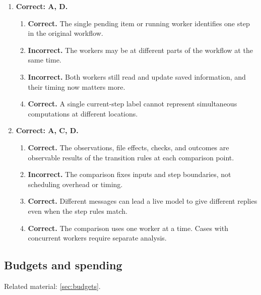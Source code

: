 \begin{enumerate}[start=41,itemsep=0.7\baselineskip]
\item[{\hyperref[exercise:49]{49.}}] \begin{minipage}[t]{\linewidth}
\textbf{Correct: A, D.}
\begin{enumerate}[label=\textnormal{(\Alph*)},leftmargin=*,itemsep=0pt]
\item \textbf{Correct.} The single pending item or running worker identifies one step in the original workflow.
\item \textbf{Incorrect.} The workers may be at different parts of the workflow at the same time.
\item \textbf{Incorrect.} Both workers still read and update saved information, and their timing now matters more.
\item \textbf{Correct.} A single current-step label cannot represent simultaneous computations at different locations.
\end{enumerate}
\end{minipage}

\item[{\hyperref[exercise:50]{50.}}] \begin{minipage}[t]{\linewidth}
\textbf{Correct: A, C, D.}
\begin{enumerate}[label=\textnormal{(\Alph*)},leftmargin=*,itemsep=0pt]
\item \textbf{Correct.} The observations, file effects, checks, and outcomes are observable results of the transition rules at each comparison point.
\item \textbf{Incorrect.} The comparison fixes inputs and step boundaries, not scheduling overhead or timing.
\item \textbf{Correct.} Different messages can lead a live model to give different replies even when the step rules match.
\item \textbf{Correct.} The comparison uses one worker at a time. Cases with concurrent workers require separate analysis.
\end{enumerate}
\end{minipage}

\end{enumerate}

\subsection{Budgets and spending}
\noindent Related material: \cref{sec:budgets}.

